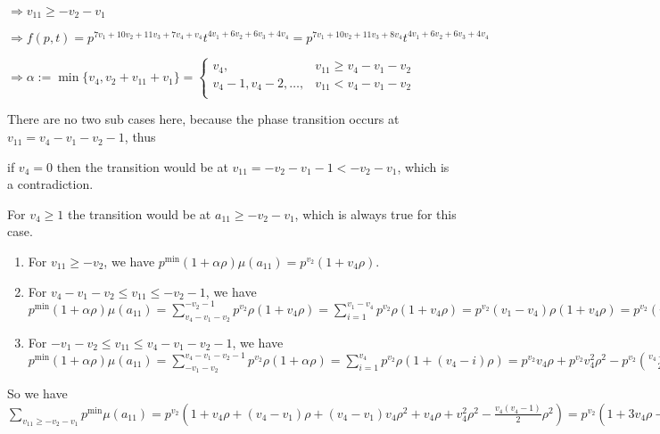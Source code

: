 \documentclass{article}
\begin{document}
$\Rightarrow{v_{11}}\geq{-v_2-v_1}$

$\Rightarrow{f(p,t)=p^{7v_1+10v_2+11v_3+7v_4+v_4}t^{4v_1+6v_2+6v_3+4v_4}=p^{7v_1+10v_2+11v_3+8v_4}t^{4v_1+6v_2+6v_3+4v_4}}$

$\Rightarrow\alpha:=\min\{v_4,v_2+v_{11}+v_1\}=\begin{cases}
       v_4, & v_{11}\geq{v_4-v_1-v_2}\\
       v_4-1,v_4-2,\dots, & v_{11}<{v_4-v_1-v_2}\\
     \end{cases}$

There are no two sub cases here, because the phase transition occurs at $v_{11}={v_4-v_1-v_2-1}$, thus 

if $v_4=0$ then the transition would be at $v_{11}=-v_2-v_1-1<-v_2-v_1$, which is a contradiction. 

For $v_4\geq{1}$ the transition would be at $a_{11}\geq{-v_2-v_1}$, which is always true for this case.
\begin{enumerate}
    \item 
For $v_{11}\geq{-v_2}$, we have $p^{\min}(1+\alpha\rho)\mu(a_{11})=p^{v_2}(1+v_4\rho).$
\item 
For $v_4-v_1-v_2\leq{v_{11}}\leq{-v_2-1}$, we have $p^{\min}(1+\alpha\rho)\mu(a_{11})=\sum_{v_4-v_1-v_2}^{-v_2-1}p^{v_2}\rho(1+v_4\rho)=\sum_{i=1}^{v_1-v_4}p^{v_2}\rho(1+v_4\rho)=p^{v_2}(v_1-v_4)\rho(1+v_4\rho)=p^{v_2}(v_1-v_4)\rho+p^{v_2}(v_1-v_4)v_4\rho^2.$
\item 
For $-v_1-v_2\leq{v_{11}}\leq{v_4-v_1-v_2-1}$, we have $p^{\min}(1+\alpha\rho)\mu(a_{11})=\sum_{-v_1-v_2}^{v_4-v_1-v_2-1}p^{v_2}\rho(1+\alpha\rho)=\sum_{i=1}^{v_4}p^{v_2}\rho(1+(v_4-i)\rho)=p^{v_2}v_4\rho+p^{v_2}v_4^2\rho^2-p^{v_2}\binom{v_4+1}{2}\rho^2.$
\end{enumerate}
So we have $\sum_{v_{11}\geq{-v_2-v_1}}p^{\min}\mu(a_{11})=p^{v_2}(1+v_4\rho+(v_4-v_1)\rho+(v_4-v_1)v_4\rho^2+v_4\rho+v_4^2\rho^2-\frac{v_4(v_4-1)}{2}\rho^2)=p^{v_2}(1+3v_4\rho-v_1\rho+2v_4^2\rho^2-v_1v_4\rho^2-\frac{v_4^2}{2}\rho^2+\frac{v_4}{2}\rho^2)$
\end{document}

